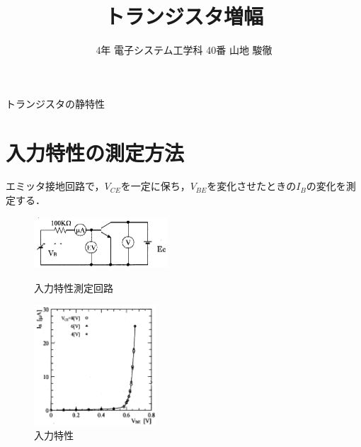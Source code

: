 \documentclass[10pt, a4j, dvipdfmx]{jarticle}
\title{トランジスタ増幅}
\author{4年 電子システム工学科 40番  山地 駿徹}
\begin{document}
    \begin{center}
        \LARGE トランジスタの静特性
    \end{center}

    \section*{入力特性の測定方法}
    エミッタ接地回路で，$V_{CE}$を一定に保ち，$V_{BE}$を変化させたときの$I_B$の変化を測定する．
    \begin{figure}[H]
        \begin{minipage}{0.5\hsize}
            \centering
            \includegraphics[width=50mm]{fig-1.png}
            \caption{入力特性測定回路}
            \label{fig:1}
        \end{minipage}
        \begin{minipage}{0.5\hsize}
            \centering
            \includegraphics[height=45mm]{fig-2.png}
            \caption{入力特性}
            \label{fig:2}
        \end{minipage}
    \end{figure}
\end{document}
